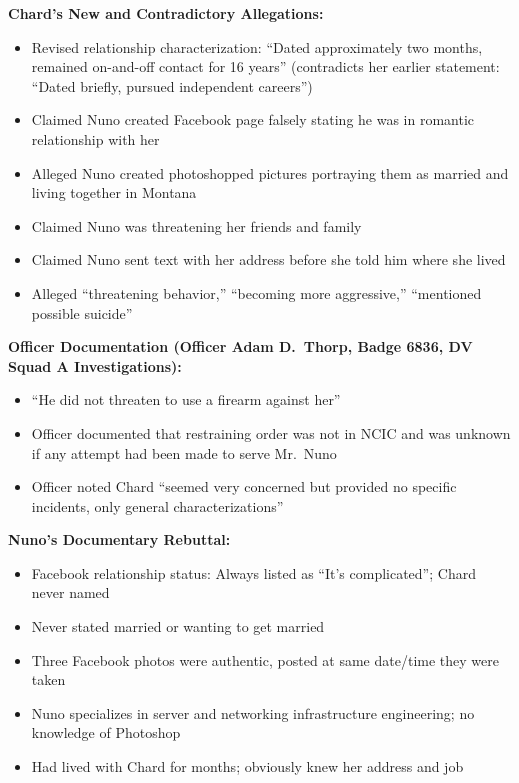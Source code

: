 \documentclass[11pt, letterpaper]{article}
\begin{document}
\textbf{Chard's New and Contradictory Allegations:}
\begin{itemize}[leftmargin=*,itemsep=2pt]
    \item Revised relationship characterization: ``Dated approximately two months, remained on-and-off contact for 16 years'' (contradicts her earlier statement: ``Dated briefly, pursued independent careers'')
    \item Claimed Nuno created Facebook page falsely stating he was in romantic relationship with her
    \item Alleged Nuno created photoshopped pictures portraying them as married and living together in Montana
    \item Claimed Nuno was threatening her friends and family
    \item Claimed Nuno sent text with her address before she told him where she lived
    \item Alleged ``threatening behavior,'' ``becoming more aggressive,'' ``mentioned possible suicide''
\end{itemize}

\textbf{Officer Documentation (Officer Adam D.\ Thorp, Badge 6836, DV Squad A Investigations):}
\begin{itemize}[leftmargin=*,itemsep=2pt]
    \item ``He did not threaten to use a firearm against her''
    \item Officer documented that restraining order was not in NCIC and was unknown if any attempt had been made to serve Mr.\ Nuno
    \item Officer noted Chard ``seemed very concerned but provided no specific incidents, only general characterizations''
\end{itemize}

\textbf{Nuno's Documentary Rebuttal:}
\begin{itemize}[leftmargin=*,itemsep=2pt]
    \item Facebook relationship status: Always listed as ``It's complicated''; Chard never named
    \item Never stated married or wanting to get married
    \item Three Facebook photos were authentic, posted at same date/time they were taken
    \item Nuno specializes in server and networking infrastructure engineering; no knowledge of Photoshop
    \item Had lived with Chard for months; obviously knew her address and job
\end{itemize}
\end{document}
